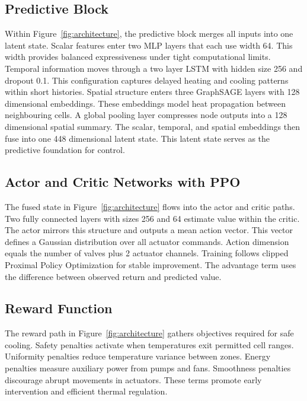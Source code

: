 \documentclass{article}
\begin{document}
\subsection{Predictive Block}

Within Figure~\ref{fig:architecture}, the predictive block merges all inputs into one latent state.
Scalar features enter two MLP layers that each use width 64.
This width provides balanced expressiveness under tight computational limits.
Temporal information moves through a two layer LSTM with hidden size 256 and dropout 0.1.
This configuration captures delayed heating and cooling patterns within short histories.
Spatial structure enters three GraphSAGE layers with 128 dimensional embeddings.
These embeddings model heat propagation between neighbouring cells.
A global pooling layer compresses node outputs into a 128 dimensional spatial summary.
The scalar, temporal, and spatial embeddings then fuse into one 448 dimensional latent state.
This latent state serves as the predictive foundation for control.

\subsection{Actor and Critic Networks with PPO}

The fused state in Figure~\ref{fig:architecture} flows into the actor and critic paths.
Two fully connected layers with sizes 256 and 64 estimate value within the critic.
The actor mirrors this structure and outputs a mean action vector.
This vector defines a Gaussian distribution over all actuator commands.
Action dimension equals the number of valves plus 2 actuator channels.
Training follows clipped Proximal Policy Optimization for stable improvement.
The advantage term uses the difference between observed return and predicted value.

\subsection{Reward Function}

The reward path in Figure~\ref{fig:architecture} gathers objectives required for safe cooling.
Safety penalties activate when temperatures exit permitted cell ranges.
Uniformity penalties reduce temperature variance between zones.
Energy penalties measure auxiliary power from pumps and fans.
Smoothness penalties discourage abrupt movements in actuators.
These terms promote early intervention and efficient thermal regulation.
\end{document}
